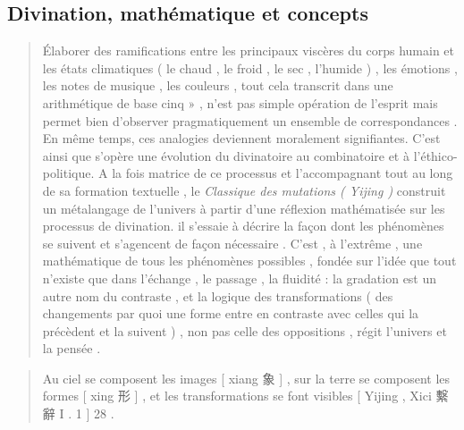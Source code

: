 \subsection{Divination, mathématique et concepts}
 \begin{quote}  

Élaborer des ramifications entre les principaux viscères du corps humain
et les états climatiques ( le chaud , le froid , le sec , l'humide ) ,
les émotions , les notes de musique , les couleurs , tout cela transcrit
dans une arithmétique de
base cinq » , n'est pas simple opération de l'esprit mais permet bien
d'observer pragmatiquement un ensemble de correspondances . En même temps, ces analogies deviennent moralement signifiantes. C’est ainsi que s’opère une évolution du divinatoire au combinatoire et à l’éthico-politique.   
A la fois matrice de ce processus et l'accompagnant tout au long de sa
formation textuelle , le \textit{Classique des mutations ( Yijing )} construit un
métalangage de l'univers à partir d'une réflexion mathématisée sur les
processus de divination.
il s'essaie à décrire la façon dont les phénomènes se suivent et
s'agencent de façon nécessaire . C'est , à l'extrême , une mathématique
de tous les phénomènes possibles , fondée sur l'idée que tout n'existe
que dans l'échange , le passage , la fluidité : la gradation est un
autre nom du contraste , et la logique des transformations ( des
changements par quoi une forme entre en contraste avec celles qui la
précèdent et la suivent ) , non pas celle des oppositions , régit
l'univers et la pensée .

\end{quote}  \begin{quote}

Au ciel se composent les images {[} xiang {象} {]} , sur la terre se
composent les formes {[} xing 形 {]} , et les transformations se font
visibles {[} Yijing , Xici 繫辭 I . 1 {]} 28 .

\end{quote} 

